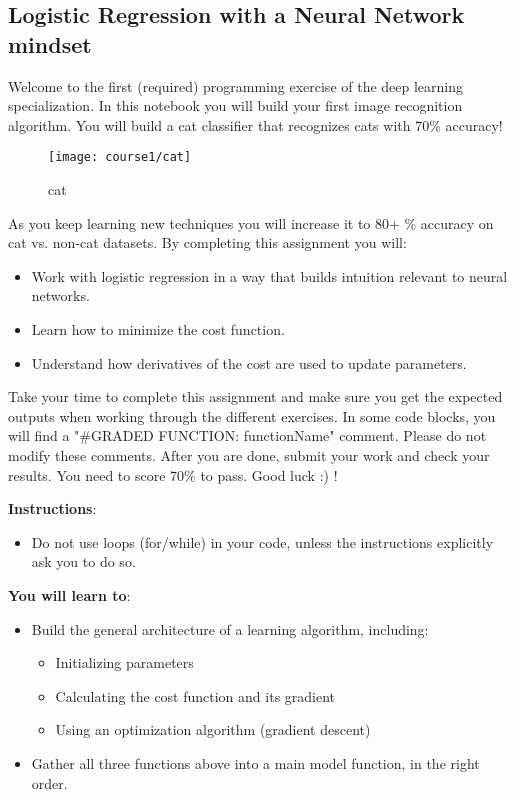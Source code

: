 
\subsection{Logistic Regression with a Neural Network mindset}

Welcome to the first (required) programming exercise of the deep learning specialization. In this notebook you will build your first image recognition algorithm. You will build a cat classifier that recognizes cats with 70\% accuracy!


\begin{figure}[h]
\begin{center}
\texttt{[image: course1/cat]}
\end{center}
\caption{cat}
\label{fig:cat}
\end{figure}

As you keep learning new techniques you will increase it to 80+ \% accuracy on cat vs. non-cat datasets. By completing this assignment you will:
\begin{itemize}
\item  Work with logistic regression in a way that builds intuition relevant to neural networks.

\item  Learn how to minimize the cost function.

\item  Understand how derivatives of the cost are used to update parameters.
\end{itemize}

Take your time to complete this assignment and make sure you get the expected outputs when working through the different exercises. In some code blocks, you will find a "\#GRADED FUNCTION: functionName" comment. Please do not modify these comments. After you are done, submit your work and check your results. You need to score 70\% to pass. Good luck :) !


{\textbf {Instructions}}:
\begin{itemize}
\item  Do not use loops (for/while) in your code, unless the instructions explicitly ask you to do so.
\end{itemize}

{\textbf {You will learn to}}:
\begin{itemize}
\item Build the general architecture of a learning algorithm, including:
\begin{itemize}
\item Initializing parameters
\item Calculating the cost function and its gradient
\item Using an optimization algorithm (gradient descent)
\end{itemize}
\item Gather all three functions above into a main model function, in the right order.
\end{itemize}


